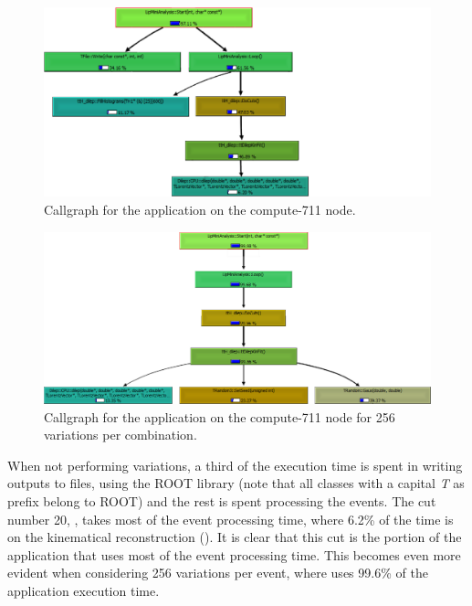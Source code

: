 \begin{figure}[!htp]
	\begin{center}
		\includegraphics[scale=0.7]{../../common/img/callgraph_start_1.png}
		\caption{Callgraph for the \tth application on the compute-711 node.}
		\label{fig:Callgraph1}
	\end{center}
\end{figure}

\begin{figure}[!htp]
	\begin{center}
		\includegraphics[scale=0.7]{../../common/img/callgraph_start_256.png}
		\caption{Callgraph for the \tth application on the compute-711 node for 256 variations per combination.}
		\label{fig:Callgraph256}
	\end{center}
\end{figure}

When not performing variations, a third of the execution time is spent in writing outputs to files, using the ROOT library (note that all classes with a capital \textit{T} as prefix belong to ROOT) and the rest is spent processing the events. The cut number 20, \ttDilepKinFit, takes most of the event processing time, where 6.2\% of the time is on the kinematical reconstruction (\dilep). It is clear that this cut is the portion of the application that uses most of the event processing time. This becomes even more evident when considering 256 variations per event, where \ttDilepKinFit uses 99.6\% of the application execution time.

